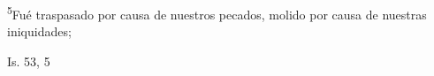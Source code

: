 \documentclass[../../rosario.tex]{subfiles}
\begin{document}
    \textsuperscript{5}Fué traspasado por causa de nuestros pecados, molido por causa de nuestras iniquidades; 
    \begin{flushright}
    Is. 53, 5
    \end{flushright}
\end{document}
